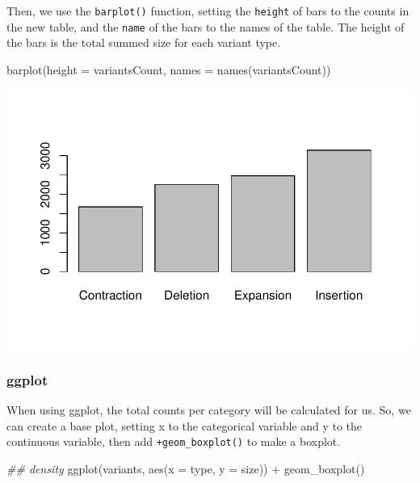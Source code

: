 \documentclass[
  letterpaper,
  DIV=11,
  numbers=noendperiod]{scrreprt}
\newenvironment{Shaded}{\begin{snugshade}}{\end{snugshade}}
\newcommand{\AttributeTok}[1]{\textcolor[rgb]{0.40,0.45,0.13}{#1}}
\newcommand{\DocumentationTok}[1]{\textcolor[rgb]{0.37,0.37,0.37}{\textit{#1}}}
\newcommand{\FunctionTok}[1]{\textcolor[rgb]{0.28,0.35,0.67}{#1}}
\newcommand{\NormalTok}[1]{\textcolor[rgb]{0.00,0.23,0.31}{#1}}
\newcommand{\SpecialCharTok}[1]{\textcolor[rgb]{0.37,0.37,0.37}{#1}}
\begin{document}
Then, we use the \texttt{barplot()} function, setting the
\texttt{height} of bars to the counts in the new table, and the
\texttt{name} of the bars to the names of the table. The height of the
bars is the total summed size for each variant type.

\begin{Shaded}
\begin{Highlighting}[]
\FunctionTok{barplot}\NormalTok{(}\AttributeTok{height =}\NormalTok{ variantsCount, }\AttributeTok{names =} \FunctionTok{names}\NormalTok{(variantsCount))}
\end{Highlighting}
\end{Shaded}

\includegraphics{scripts/02_dataViz/class3_files/figure-pdf/unnamed-chunk-18-1.pdf}

\subsubsection{ggplot}\label{ggplot-2}

When using ggplot, the total counts per category will be calculated for
us. So, we can create a base plot, setting x to the categorical variable
and y to the continuous variable, then add \texttt{+geom\_boxplot()} to
make a boxplot.

\begin{Shaded}
\begin{Highlighting}[]
\DocumentationTok{\#\# density}
\FunctionTok{ggplot}\NormalTok{(variants, }\FunctionTok{aes}\NormalTok{(}\AttributeTok{x =}\NormalTok{ type, }\AttributeTok{y =}\NormalTok{ size)) }\SpecialCharTok{+}
  \FunctionTok{geom\_boxplot}\NormalTok{()}
\end{Highlighting}
\end{Shaded}
\end{document}
